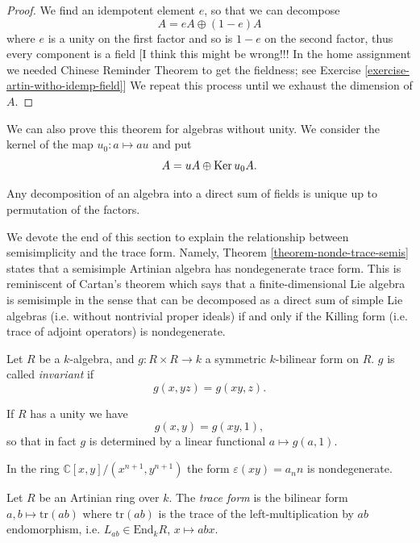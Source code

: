 \begin{proof}
We find an idempotent element $e$,
so that we can decompose
$$
A=eA\oplus (1-e)A
$$
where $e$ is a unity on the first
factor and so is $1-e$ on the second
factor, thus every component
is a field [I think this might be
wrong!!! In the home assignment
we needed Chinese Reminder Theorem
to get the fieldness;
see Exercise
\ref{exercise-artin-witho-idemp-field}]
We repeat this process until we
exhaust the dimension of $A$.
\end{proof}

\noindent
We can also prove this theorem for
algebras without unity.
We consider the kernel of the map
$u_0:a \mapsto au$ and put
$$
A=u A \oplus \mathop{\mathrm{Ker}} u_0A.
$$
\begin{lemma}
\label{lemma-unique-decomposition-algebras}
Any decomposition of an algebra into
a direct sum of fields
is unique up to permutation of the
factors.
\end{lemma}


\medskip\noindent
We devote the end of this section
to explain the relationship
between semisimplicity and the trace form.
Namely,
Theorem
\ref{theorem-nonde-trace-semis}
states that a semisimple Artinian
algebra has nondegenerate trace form.
This is reminiscent of Cartan's
theorem which says that a
finite-dimensional Lie algebra
is semisimple in the sense that can be
decomposed as a direct sum of simple
Lie algebras (i.e. without nontrivial
proper ideals) if and only if the
Killing form (i.e. trace of adjoint
operators) is nondegenerate.

\begin{definition}
\label{definition-invariant-bilinear-form}
Let $R$ be a $k$-algebra, and $g:R \times R
\to k$
a symmetric $k$-bilinear form on $R$.
$g$ is called {\it invariant} if
$$
g(x,yz)=g(xy,z).
$$
\end{definition}

If $R$ has a unity we have
$$
g(x,y)=g(xy,1),
$$
so that in fact $g$ is determined by a
linear functional $a \mapsto g(a,1)$.

\begin{example}
\label{example-invariant-nondegenerate-form}
In the ring
$\mathbb{C}[x,y]/(x^{n+1},y^{n+1})$
the form $\varepsilon(xy)=a_nn$
is nondegenerate.
\end{example}

\begin{definition}
\label{definition-trace-form}
Let $R$ be an Artinian ring over $k$.
The {\it trace form} is the bilinear form
$a,b \mapsto \text{tr}(ab)$
where $\text{tr}(ab)$ is the trace
of the left-multiplication
by $ab$ endomorphism, i.e.
$L_{ab} \in \text{End}_kR$,
$x \mapsto abx$.
\end{definition}

